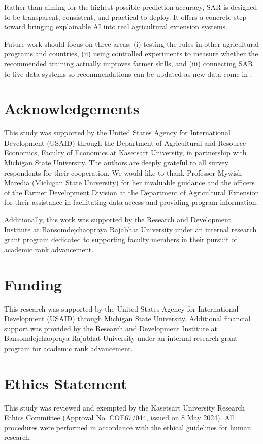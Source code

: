 \documentclass[fleqn,10pt,lineno]{wlpeerj}
\begin{document}
Rather than aiming for the highest possible prediction accuracy, 
SAR is designed to be transparent, consistent, and practical to 
deploy. It offers a concrete step toward bringing explainable AI 
into real agricultural extension systems.

Future work should focus on three areas: (i) testing the rules 
in other agricultural programs and countries, (ii) using 
controlled experiments to measure whether the recommended 
training actually improves farmer skills, and (iii) connecting 
SAR to live data systems so recommendations can be updated as 
new data come in \citep{yang2025,zhang2026}.

\section*{Acknowledgements}
This study was supported by the United States Agency for International Development (USAID) through the Department of Agricultural and Resource Economics, Faculty of Economics at Kasetsart University, in partnership with Michigan State University. The authors are deeply grateful to all survey respondents for their cooperation. We would like to thank Professor Mywish Maredia (Michigan State University) for her invaluable guidance and the officers of the Farmer Development Division at the Department of Agricultural Extension for their assistance in facilitating data access and providing program information. 

Additionally, this work was supported by the Research and Development Institute at Bansomdejchaopraya Rajabhat University under an internal research grant program dedicated to supporting faculty members in their pursuit of academic rank advancement.

\section*{Funding}
This research was supported by the United States Agency for International Development (USAID) through Michigan State University. Additional financial support was provided by the Research and Development Institute at Bansomdejchaopraya Rajabhat University under an internal research grant program for academic rank advancement.

\section*{Ethics Statement}
This study was reviewed and exempted by the Kasetsart University Research Ethics Committee (Approval No. COE67/044, issued on 8 May 2024). All procedures were performed in accordance with the ethical guidelines for human research.
\end{document}
